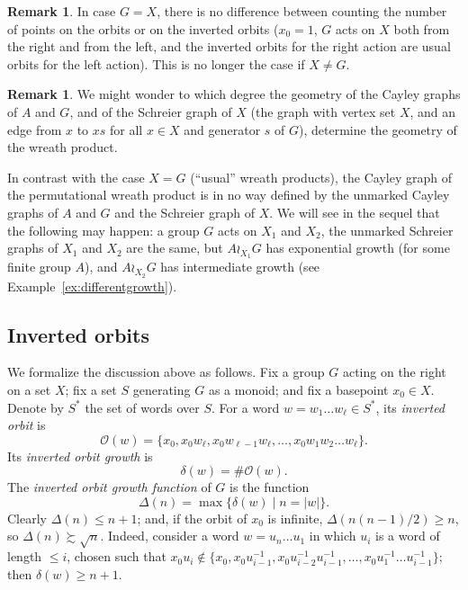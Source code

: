 \documentclass{amsart}
\theoremstyle{definition}
\newtheorem{remark}[lemma]{Remark}
\begin{document}
\begin{remark}
  In case $G=X$, there is no difference between counting the number of
  points on the orbits or on the inverted orbits ($x_0=1$, $G$ acts
  on $X$ both from the right and from the left, and the inverted
  orbits for the right action are usual orbits for the left action).
  This is no longer the case if $X\ne G$.
\end{remark}

\begin{remark}
  We might wonder to which degree the geometry of the Cayley graphs of
  $A$ and $G$, and of the Schreier graph of $X$ (the graph with vertex
  set $X$, and an edge from $x$ to $xs$ for all $x\in X$ and generator
  $s$ of $G$), determine the geometry of the wreath product.

  In contrast with the case $X=G$ (``usual'' wreath products), the
  Cayley graph of the permutational wreath product is in no way
  defined by the unmarked Cayley graphs of $A$ and $G$ and the
  Schreier graph of $X$. We will see in the sequel that the following
  may happen: a group $G$ acts on $X_1$ and $X_2$, the unmarked
  Schreier graphs of $X_1$ and $X_2$ are the same, but $A\wr_{X_1}G$
  has exponential growth (for some finite group $A$), and
  $A\wr_{X_2}G$ has intermediate growth (see
  Example~\ref{ex:differentgrowth}).
\end{remark}

\subsection{Inverted orbits}\label{ss:invorb}
We formalize the discussion above as follows. Fix a group $G$ acting
on the right on a set $X$; fix a set $S$ generating $G$ as a monoid;
and fix a basepoint $x_0\in X$. Denote by $S^*$ the set of words over
$S$. For a word $w=w_1\dots w_\ell\in S^*$, its \emph{inverted orbit}
is
\[\mathcal O(w)=\{x_0,x_0 w_\ell,x_0w_{\ell-1}w_\ell,\dots,x_0w_1w_2\dots w_\ell\}.
\]
Its \emph{inverted orbit growth} is
\[\delta(w)=\#\mathcal O(w).\]
The \emph{inverted orbit growth function} of $G$ is the function
\[\Delta(n)=\max\{\delta(w)\mid n=|w|\}.\]
Clearly $\Delta(n)\le n+1$; and, if the orbit of $x_0$ is infinite,
$\Delta(n(n-1)/2)\ge n$, so $\Delta(n)\succsim\sqrt n$. Indeed,
consider a word $w=u_n\dots u_1$ in which $u_i$ is a word of length
$\le i$, chosen such that
$x_0u_i\not\in\{x_0,x_0u_{i-1}^{-1},x_0u_{i-2}^{-1}u_{i-1}^{-1},\dots,x_0u_1^{-1}\dots
u_{i-1}^{-1}\}$; then $\delta(w)\ge n+1$.
\end{document}
